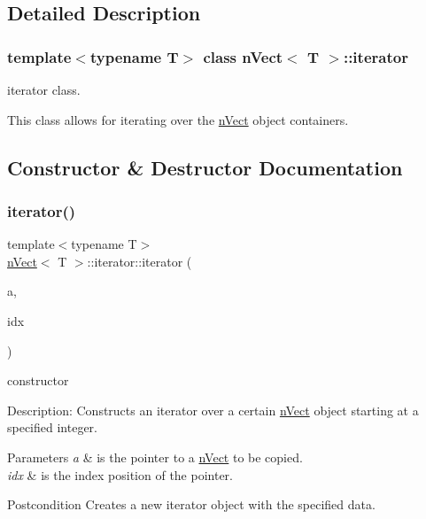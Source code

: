 \subsection{Detailed Description}
\subsubsection*{template$<$typename T$>$\newline
class n\+Vect$<$ T $>$\+::iterator}

iterator class. 

This class allows for iterating over the \hyperlink{classnVect}{n\+Vect} object containers. 

\subsection{Constructor \& Destructor Documentation}
\mbox{\label{classnVect_1_1iterator_a8e19f7baeffbc2b8320f4b530be16d86}} 
\subsubsection{\texorpdfstring{iterator()}{iterator()}}
{\footnotesize\ttfamily template$<$typename T$>$ \\
\hyperlink{classnVect}{n\+Vect}$<$ T $>$\+::iterator\+::iterator (\begin{DoxyParamCaption}\item[{\hyperlink{classnVect}{n\+Vect}$<$ T $>$ $\ast$}]{a,  }\item[{unsigned int}]{idx }\end{DoxyParamCaption})\hspace{0.3cm}{\ttfamily [inline]}}



constructor 

Description\+: Constructs an iterator over a certain \hyperlink{classnVect}{n\+Vect} object starting at a specified integer. 
\begin{DoxyParams}{Parameters}
{\em a} & is the pointer to a \hyperlink{classnVect}{n\+Vect} to be copied. \\
\hline
{\em idx} & is the index position of the pointer. \\
\hline
\end{DoxyParams}
\begin{DoxyPostcond}{Postcondition}
Creates a new iterator object with the specified data. 
\end{DoxyPostcond}


